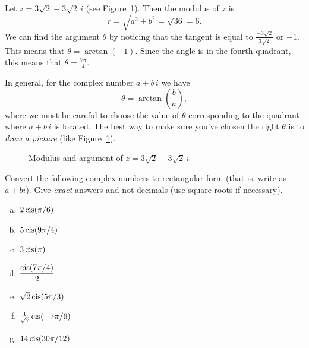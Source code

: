 \begin{example}{2} Let $z=3\sqrt{2}-3\sqrt{2}\, i$ (see Figure~\ref{fig:complex:polar_to_cart}). Then the modulus of $z$ is 
\[
r=\sqrt{a^{2}+b^{2}}=\sqrt{36}=6.\]
 We can find the argument $\theta$ by noticing that the tangent is equal to $\frac{-3\sqrt{2}}{3\sqrt{2}}$ or $-1$. This means that
 $\theta = \arctan(-1)$.
 Since the angle is in the fourth quadrant, this means that $\theta = \frac{7\pi}{4}$. 
 
 In general, for the complex number $a + b\,i$ we have
 \[\theta=\arctan\left(\frac{b}{a}\right),\]
where we must be careful to choose the value of $\theta$ corresponding to the quadrant where $a + b\,i$ is located. The best way to make sure you've chosen the right $\theta$ is to \emph{draw a picture} (like Figure~\ref{fig:complex:polar_to_cart}).
 \end{example} 
\begin{figure}[htb]
	  \caption{\label{fig:complex:polar_to_cart} Modulus and argument of  $z=3\sqrt{2}-3\sqrt{2}\, i$}
\end{figure}

\begin{exercise}{21}
Convert the following complex numbers to rectangular form (that is, write as $a + bi$). Give \emph{exact} answers and not decimals (use square roots if necessary).
\begin{multicols}{2}
\begin{enumerate}[(a)]

\item
$2 \operatorname{cis}(\pi / 6 )$
\item
$5 \operatorname{cis}(9\pi/4)$
\item
$3 \operatorname{cis}(\pi)$
 \item
$\dfrac{\operatorname{cis}(7\pi/4)}{2}$
\item
$\sqrt{2} \operatorname{cis}(5\pi / 3 )$
\item
$\frac{1}{\sqrt{7}} \operatorname{cis}(-7\pi / 6 )$
\item
$14 \operatorname{cis}(30 \pi / 12 )$

\end{enumerate}
\end{multicols}
\end{exercise}

